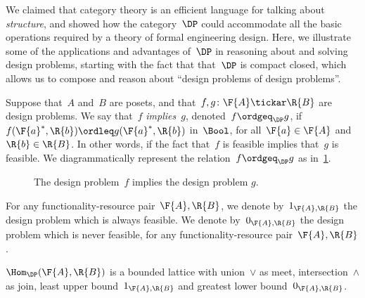 We claimed that category theory is an efficient language for talking about \emph{structure}, and showed how the category~$\DP$ could accommodate all the basic operations required by a theory of formal engineering design. Here, we illustrate some of the applications and advantages of~$\DP$ in reasoning about and solving design problems, starting with the fact that that~$\DP$ is compact closed, which allows us to compose and reason about ``design problems of design problems''.

\begin{definition}[Order on~$\DP$]
\label{def:DP_loc_pos}

Suppose that~$A$ and~$B$ are posets, and that~$f,g \colon \F{A} \tickar \R{B}$ are design problems. We say that~$f$ \emph{implies}~$g$, denoted~$f \ordgeq_{\DP} g$, if~$f(\F{a}^*,\R{b}) \ordleq g(\F{a}^*,\R{b} )$ in~$\Bool$, for all~$\F{a} \in \F{A}$
and~$\R{b} \in \R{B}$. In other words, if the fact that~$f$ is feasible implies that~$g$ is feasible. We diagrammatically represent the relation~$f \ordgeq_{\DP} g$ as in~\cref{fig:dpimplies}.
\end{definition}

\begin{figure}[h!]
\begin{center}
\end{center}
\caption{The design problem~$f$ implies the design problem $g$. \label{fig:dpimplies}}
\end{figure}

\begin{remark}
For any functionality-resource pair~$\F{A},\R{B}$, we denote by~$1_{\F{A},\R{B}}$ the design problem which is always feasible. We denote by~$0_{\F{A},\R{B}}$ the design problem which is never feasible, for any functionality-resource pair~$\F{A},\R{B}$.
\end{remark}
\begin{lemma}
\label{lemma:dpboundedlattice}
$\Hom_\DP(\F{A},\R{B})$ is a bounded lattice with union~$\vee$ as meet, intersection~$\wedge$ as join, least upper bound~$1_{\F{A},\R{B}}$ and greatest lower bound~$0_{\F{A},\R{B}}$.
\end{lemma}

